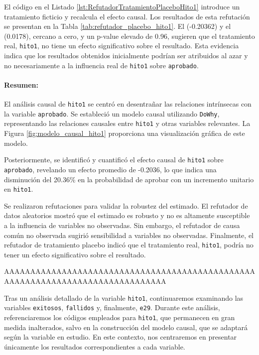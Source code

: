 El código en el Listado \ref{lst:RefutadorTratamientoPlaceboHito1} introduce un tratamiento ficticio y recalcula el efecto causal. Los resultados de esta refutación se presentan en la Tabla \ref{tab:refutador_placebo_hito1}. El  (-0.20362) y el  (0.0178), cercano a cero, y un p-value elevado de 0.96, sugieren que el tratamiento real, \texttt{hito1}, no tiene un efecto significativo sobre el resultado. Esta evidencia indica que los resultados obtenidos inicialmente podrían ser atribuidos al azar y no necesariamente a la influencia real de \texttt{hito1} sobre \texttt{aprobado}.

\paragraph{Resumen:} El análisis causal de \texttt{hito1} se centró en desentrañar las relaciones intrínsecas con la variable \texttt{aprobado}. Se estableció un modelo causal utilizando \texttt{DoWhy}, representando las relaciones causales entre \texttt{hito1} y otras variables relevantes. La Figura \ref{fig:modelo_causal_hito1} proporciona una visualización gráfica de este modelo.

Posteriormente, se identificó y cuantificó el efecto causal de \texttt{hito1} sobre \texttt{aprobado}, revelando un efecto promedio de -0.2036, lo que indica una disminución del 20.36\% en la probabilidad de aprobar con un incremento unitario en \texttt{hito1}.

Se realizaron refutaciones para validar la robustez del estimado. El refutador de datos aleatorios mostró que el estimado es robusto y no es altamente susceptible a la influencia de variables no observadas. Sin embargo, el refutador de causa común no observada sugirió sensibilidad a variables no observadas. Finalmente, el refutador de tratamiento placebo indicó que el tratamiento real, \texttt{hito1}, podría no tener un efecto significativo sobre el resultado.


AAAAAAAAAAAAAAAAAAAAAAAAAAAAAAAAAAAAAAAAAAAAAAAAAAAAAAAAAAAAAAAAAAAAAAAAAAAAAAA

Tras un análisis detallado de la variable \texttt{hito1}, continuaremos examinando las variables \texttt{exitosos}, \texttt{fallidos} y, finalmente, \texttt{e29}. Durante este análisis, referenciaremos los códigos empleados para \texttt{hito1}, que permanecen en gran medida inalterados, salvo en la construcción del modelo causal, que se adaptará según la variable en estudio. En este contexto, nos centraremos en presentar únicamente los resultados correspondientes a cada variable.



